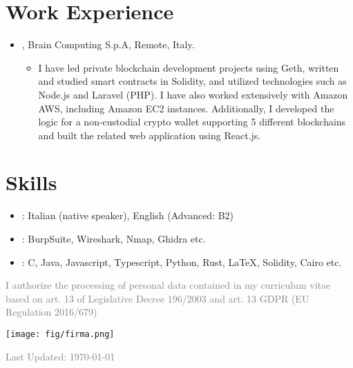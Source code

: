\documentclass{color-cv}
\begin{document}
    
    \section{Work Experience}
    \begin{itemize}
      
    \item {}, Brain Computing S.p.A, Remote, Italy.
      \begin{itemize}
          \item I have led private blockchain development projects using Geth, written and studied smart contracts in Solidity, and utilized technologies such as Node.js and Laravel (PHP). I have also worked extensively with Amazon AWS, including Amazon EC2 instances. Additionally, I developed the logic for a non-custodial crypto wallet supporting 5 different blockchains and built the related web application using React.js.
        \end{itemize}
    \end{itemize}
    
    
    
    \section{Skills}
    \begin{itemize}
      \item {}: Italian (native speaker), English (Advanced: B2)
      \item {}: BurpSuite, Wireshark, Nmap, Ghidra etc.
      \item {}: C, Java, Javascript, Typescript, Python, Rust, \LaTeX{}, Solidity, Cairo etc.
    \end{itemize}
    
    \vfill\noindent\textcolor{gray}{\small I authorize the processing of personal data contained in my curriculum vitae based on art. 13 of Legislative Decree 196/2003 and art. 13
    GDPR (EU Regulation 2016/679)}
    
    \noindent
    \hfill
    \begin{minipage}{0.2\linewidth} %
        \centering
        \texttt{[image: fig/firma.png]}
    \end{minipage}
    
    \vfill\noindent\centering\textcolor{gray}{\small Last Updated: \today{}}
    
    
\end{document}
